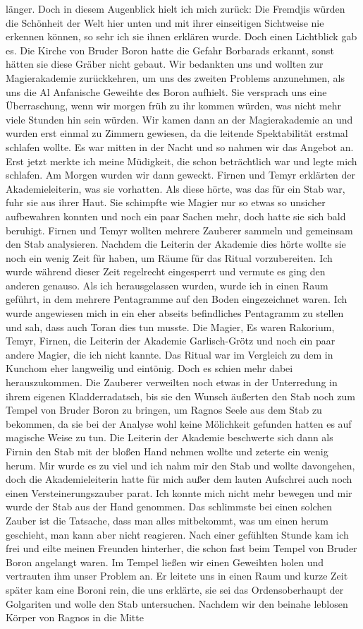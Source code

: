 länger. Doch in diesem Augenblick hielt ich mich zurück: Die Fremdjis würden die Schönheit der Welt hier unten und mit ihrer einseitigen Sichtweise nie erkennen können, so sehr ich sie ihnen erklären wurde. Doch einen Lichtblick gab es. Die Kirche von Bruder Boron hatte die Gefahr Borbarads erkannt, sonst hätten sie diese Gräber nicht gebaut. Wir bedankten uns und wollten zur Magierakademie zurückkehren, um uns des zweiten Problems anzunehmen, als uns die Al Anfanische Geweihte des Boron aufhielt. Sie versprach uns eine Überraschung, wenn wir morgen früh zu ihr kommen würden, was nicht mehr viele Stunden hin sein würden. Wir kamen dann an der Magierakademie an und wurden erst einmal zu Zimmern gewiesen, da die leitende Spektabilität erstmal schlafen wollte. Es war mitten in der Nacht und so nahmen wir das Angebot an. Erst jetzt merkte ich meine Müdigkeit, die schon beträchtlich war und legte mich schlafen. Am Morgen wurden wir dann geweckt. Firnen und Temyr erklärten der Akademieleiterin, was sie vorhatten. Als diese hörte, was das für ein Stab war, fuhr sie aus ihrer Haut. Sie schimpfte wie Magier nur so etwas so unsicher aufbewahren konnten und noch ein paar Sachen mehr, doch hatte sie sich bald beruhigt. Firnen und Temyr wollten mehrere Zauberer sammeln und gemeinsam den Stab analysieren. Nachdem die Leiterin der Akademie dies hörte wollte sie noch ein wenig Zeit für haben, um Räume für das Ritual vorzubereiten. Ich wurde während dieser Zeit regelrecht eingesperrt und vermute es ging den anderen genauso. Als ich herausgelassen wurden, wurde ich in einen Raum geführt, in dem mehrere Pentagramme auf den Boden eingezeichnet waren. Ich wurde angewiesen mich in ein eher abseits befindliches Pentagramm zu stellen und sah, dass auch Toran dies tun musste. Die Magier, Es waren Rakorium, Temyr, Firnen, die Leiterin der Akademie Garlisch-Grötz und noch ein paar andere Magier, die ich nicht kannte. Das Ritual war im Vergleich zu dem in Kunchom eher langweilig und eintönig. Doch es schien mehr dabei herauszukommen. Die Zauberer verweilten noch etwas in der Unterredung in ihrem eigenen Kladderradatsch, bis sie den Wunsch äußerten den Stab noch zum Tempel von Bruder Boron zu bringen, um Ragnos Seele aus dem Stab zu bekommen, da sie bei der Analyse wohl keine Mölichkeit gefunden hatten es auf magische Weise zu tun. Die Leiterin der Akademie beschwerte sich dann als Firnin den Stab mit der bloßen Hand nehmen wollte und zeterte ein wenig herum. Mir wurde es zu viel und ich nahm mir den Stab und wollte davongehen, doch die Akademieleiterin hatte für mich außer dem lauten Aufschrei auch noch einen Versteinerungszauber parat. Ich konnte mich nicht mehr bewegen und mir wurde der Stab aus der Hand genommen. Das schlimmste bei einen solchen Zauber ist die Tatsache, dass man alles mitbekommt, was um einen herum geschieht, man kann aber nicht reagieren. Nach einer gefühlten Stunde kam ich frei und eilte meinen Freunden hinterher, die schon fast beim Tempel von Bruder Boron angelangt waren. Im Tempel ließen wir einen Geweihten holen und vertrauten ihm unser Problem an. Er leitete uns in einen Raum und kurze Zeit später kam eine Boroni rein, die uns erklärte, sie sei das Ordensoberhaupt der Golgariten und wolle den Stab untersuchen. Nachdem wir den beinahe leblosen Körper von Ragnos in die Mitte 